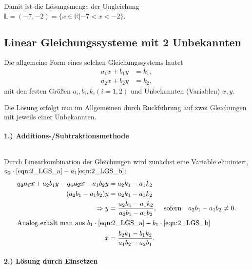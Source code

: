 Damit ist die Lösungsmenge der Ungleichung $\mathbb{L} = (-7,-2) = \{x\in \mathbb{R}|-7 < x<-2\}$.


\subsection{Linear Gleichungssysteme mit 2 Unbekannten}

Die allgemeine Form eines solchen Gleichungssystems lautet 
\begin{subequations}
\begin{align}
        a_1 x + b_1 y &= k_1, \label{eqn:2_LGS_a}\\
        a_2 x + b_2 y &= k_2,\label{eqn:2_LGS_b}
    \end{align}
\end{subequations}
mit den festen Größen $a_i, b_i, k_i (i=1,2)$ und Unbekannten (Variablen) $x,y$.

Die Lösung erfolgt nun im Allgemeinen durch Rückführung auf zwei Gleichungen mit jeweils einer Unbekannten. 

\paragraph{1.) Additions-/Subtraktionsmethode}$~$

Durch Linearkombination der Gleichungen wird zunächst eine Variable eliminiert, $a_2 \cdot \eqref{eqn:2_LGS_a} - a_1 \eqref{eqn:2_LGS_b}$: 
\begin{align}
    \cancel{a_2 a_1 x} + a_2 b_1 y - \cancel{a_1a_2 x} - a_1 b_2 y &= a_2 k_1 -a_1 k_2 \notag \\
    (a_2 b_1 -a_1 b_2) y &= a_2 k_1 - a_1 k_2 \notag \\
    \Rightarrow y &= \frac{a_2 k_1 - a_1 k_2}{a_2 b_1 - a_1 b_2}, \qq{sofern} a_2 b_1 - a_1 b_2 \neq 0.\\
\intertext{Analog erhält man aus $b_1\cdot \eqref{eqn:2_LGS_a} - b_1 \cdot \eqref{eqn:2_LGS_b}$}
    x &= \frac{b_2 k_1 - b_1 k_2}{a_1 b_2 -a_2 b_1}.
\end{align}

\paragraph{2.) Lösung durch Einsetzen}$~$


